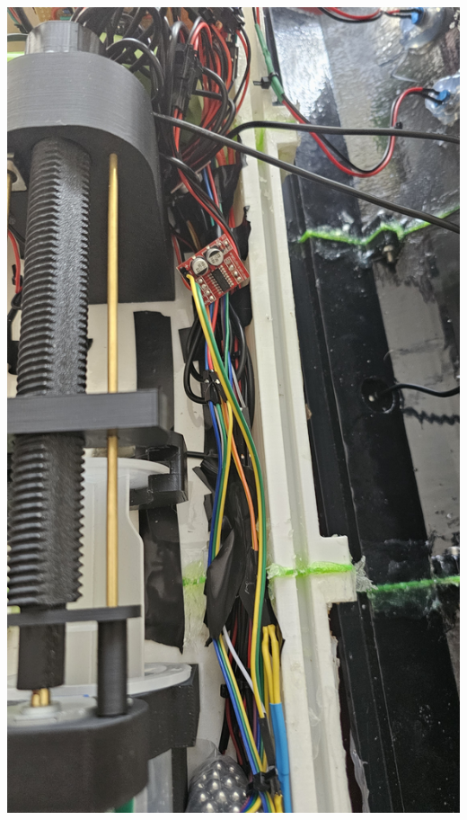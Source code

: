 \documentclass[11pt,a4paper,titlepage]{report}
\begin{document}
	\begin{center}
		\label{picture:images_build_8}
		\includegraphics[width=\linewidth]{assets/AUV_Build8.jpg}
	\end{center}
\end{document}
